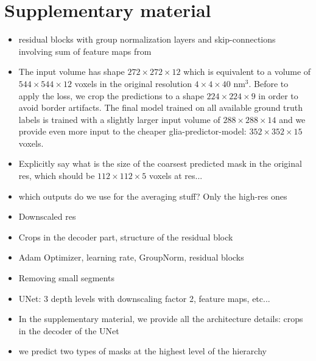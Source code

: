
\section{Supplementary material}
\begin{itemize}
\item residual blocks with group normalization layers and skip-connections involving sum of feature maps from 
\item The input volume has shape $272 \times 272\times12$ which is equivalent to a volume of $544\times 544\times 12$ voxels in the original resolution $4\times 4\times 40$ nm$^3$. Before to apply the loss, we crop the predictions to a shape $224\times 224\times 9$ in order to avoid border artifacts. 
The final model trained on all available ground truth labels is trained with a slightly larger input volume of $288\times 288\times 14$ and we provide even more input to the cheaper glia-predictor-model: $352\times 352\times 15$ voxels. 
\item Explicitly say what is the size of the coarsest predicted mask in the original res, which should be $112 \times 112 \times 5$ voxels at res...
\item which outputs do we use for the averaging stuff? Only the high-res ones
\item Downscaled res
\item Crops in the decoder part, structure of the residual block
\item Adam Optimizer, learning rate, GroupNorm, residual blocks
\item Removing small segments
\item UNet: 3 depth levels with downscaling factor 2, feature maps, etc...
\item In the supplementary material, we provide all the architecture details: crops in the decoder of the UNet
\item we predict two types of \maskname masks at the highest level of the hierarchy
\end{itemize}

